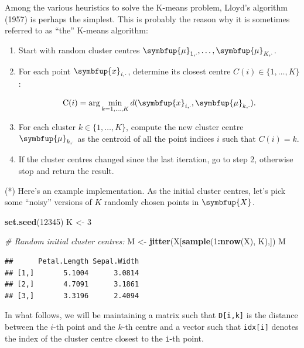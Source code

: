 \documentclass[10pt,b5paper,krantz1]{krantz}
\newenvironment{Shaded}{\begin{snugshade}}{\end{snugshade}}
\newcommand{\CommentTok}[1]{\textcolor[rgb]{0.37,0.37,0.37}{\textit{#1}}}
\newcommand{\DecValTok}[1]{\textcolor[rgb]{0.06,0.06,0.06}{#1}}
\newcommand{\KeywordTok}[1]{\textcolor[rgb]{0.27,0.27,0.27}{\textbf{#1}}}
\newcommand{\NormalTok}[1]{#1}
\newcommand{\OperatorTok}[1]{\textcolor[rgb]{0.43,0.43,0.43}{\textbf{#1}}}
\newcommand{\StringTok}[1]{\textcolor[rgb]{0.5,0.5,0.5}{#1}}
\renewcommand{\mathbf}[1]{\symbfup{#1}}
\renewcommand{\boldsymbol}[1]{\symbfup{#1}}
\begin{document}
\bigskip

Among the various heuristics to solve the K-means problem,
Lloyd's algorithm (1957) is perhaps the simplest.
This is probably the reason why it is sometimes referred
to as ``the'' K-means algorithm:

\begin{enumerate}
\def\labelenumi{\arabic{enumi}.}
\item
  Start with random cluster centres \(\boldsymbol\mu_{1,\cdot}, \dots, \boldsymbol\mu_{K,\cdot}\).
\item
  For each point \(\mathbf{x}_{i,\cdot}\), determine its closest centre \(C(i)\in\{1,\dots,K\}\):

  \[
   \mathrm{C}(i) = \mathrm{arg}\min_{k=1,\dots,K}
   d(\mathbf{x}_{i,\cdot}, \boldsymbol\mu_{k,\cdot}).
   \]
\item
  For each cluster \(k\in\{1,\dots,K\}\), compute the new cluster centre \(\boldsymbol\mu_{k,\cdot}\) as the centroid of
  all the point indices \(i\) such that \(C(i)=k\).
\item
  If the cluster centres changed since the last iteration, go to step 2,
  otherwise stop and return the result.
\end{enumerate}

\bigskip

(*) Here's an example implementation.
As the initial cluster centres, let's pick some ``noisy'' versions
of \(K\) randomly chosen points in \(\mathbf{X}\).

\begin{Shaded}
\begin{Highlighting}[]
\KeywordTok{set.seed}\NormalTok{(}\DecValTok{12345}\NormalTok{)}
\NormalTok{K <-}\StringTok{ }\DecValTok{3}

\CommentTok{# Random initial cluster centres:}
\NormalTok{M <-}\StringTok{ }\KeywordTok{jitter}\NormalTok{(X[}\KeywordTok{sample}\NormalTok{(}\DecValTok{1}\OperatorTok{:}\KeywordTok{nrow}\NormalTok{(X), K),])}
\NormalTok{M}
\end{Highlighting}
\end{Shaded}

\begin{verbatim}
##      Petal.Length Sepal.Width
## [1,]       5.1004      3.0814
## [2,]       4.7091      3.1861
## [3,]       3.3196      2.4094
\end{verbatim}

In what follows, we will be maintaining a matrix
such that \texttt{D{[}i,k{]}} is the distance between the \(i\)-th point
and the \(k\)-th centre and a vector such that \texttt{idx{[}i{]}}
denotes the index of the cluster centre closest to the \texttt{i}-th point.
\end{document}
